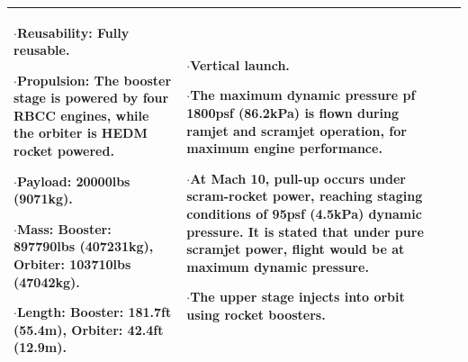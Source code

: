 {\begin{landscape}
\begin{xltabular}{\linewidth}{|X|X|X|}
	$\cdot$\textbf{Reusability:} Fully reusable. 
	
	$\cdot$\textbf{Propulsion:} The booster stage is powered by four RBCC engines, while the orbiter is HEDM rocket powered. 
	
	$\cdot$\textbf{Payload:} 20000lbs (9071kg).
	
	$\cdot$\textbf{Mass:} Booster: 897790lbs (407231kg), Orbiter: 103710lbs (47042kg).  
	
	$\cdot$\textbf{Length:} Booster: 181.7ft (55.4m), Orbiter: 42.4ft (12.9m).
	&\small
	
	$\cdot$Vertical launch.
	
	$\cdot$The maximum dynamic pressure pf 1800psf (86.2kPa) is flown during ramjet and scramjet operation, for maximum engine performance. 
	
	$\cdot$At Mach 10, pull-up occurs under scram-rocket power, reaching staging conditions of 95psf (4.5kPa) dynamic pressure. It is stated that under pure scramjet power, flight would be at maximum dynamic pressure. 
	
	$\cdot$The upper stage injects into orbit using rocket boosters. 
	

	\\
\hline 
\end{xltabular} 
\end{landscape}
}


